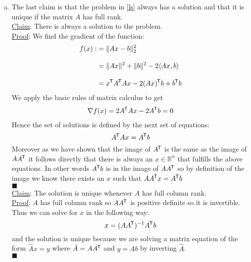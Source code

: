 \documentclass{article}
\DeclarePairedDelimiter{\norm}{\lVert}{\rVert}
\newcommand*{\tran}{^{\mkern-1.5mu\mathsf{T}}}%
\begin{document}
\begin{enumerate}[a)]
		\item The last claim is that the problem in \ref{ls} always has a solution and that it is unique if the matrix $A$ has full rank.\\[2ex]
		\underline{Claim}: There is always a solution to the problem.\\
		\underline{Proof}: We find the gradient of the function:
		\begin{align*}
			f(x) :&= \norm{Ax- b}_2^2\\[2ex]
				  &= \norm{Ax}^2 + \norm b ^2 - 2\langle Ax,b \rangle\\[2ex]
				  &= x\tran A\tran A x - 2 (Ax)\tran b + b\tran b
		\end{align*}
		We apply the basic rules of matrix calculus to get
		\begin{align}
			\nabla f(x) = 2 A\tran A x  - 2A\tran b = 0
		\end{align}
		Hence the set of solutions is defined by the next set of equations:
		\begin{equation}
			A\tran A x = A\tran b
		\end{equation}
		Moreover as we have shown that the image of $A\tran$ is the same as the image of $AA\tran$  it follows directly that there is always an $x\in \mathbb R^n$ that fulfills the above equations. In other words $A\tran b$ is in the image of $AA\tran$ so by definition of the image we know there exists an $x$ such that $AA\tran x = A\tran b$\\
		$\blacksquare$ \\[2ex]
		\underline{Claim}: The solution is unique whenever $A$ has full column rank. \\
		\underline{Proof}: 
		$A$ has full column rank  so $AA\tran$ is positive definite  so it is invertible. Thus we can solve for $x$ in the following way:
		\begin{equation}\label{normal}
		x = (AA\tran)^{-1} A\tran b
		\end{equation}
		and the solution is unique because we are solving a matrix equation of the form $\hat A x = y$ where $\hat A = AA\tran$ and $y = Ab$ by inverting $\hat A$.\\
		$\blacksquare$
		
		\clearpage
		
		

\end{enumerate}
\end{document}
